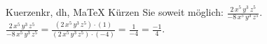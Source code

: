 \begin{MAufgabe}{Kuerzen}{kr, dh, MaTeX}
K\"urzen Sie soweit m\"oglich: $\frac{2\, x^5\, y^3\, z^5}{- 8\, x^5\, y^3\, z^5}$.\\ 
\ifLsg\MLoesung
\quad $\frac{2\, x^5\, y^3\, z^5}{- 8\, x^5\, y^3\, z^5}=\frac{(2\, x^5\, y^3\, z^5)\cdot(1)}{(2\, x^5\, y^3\, z^5)\cdot(-4)}=\frac{1}{-4}=\frac{-1}{4}$.\else\relax\fi
 \end{MAufgabe}